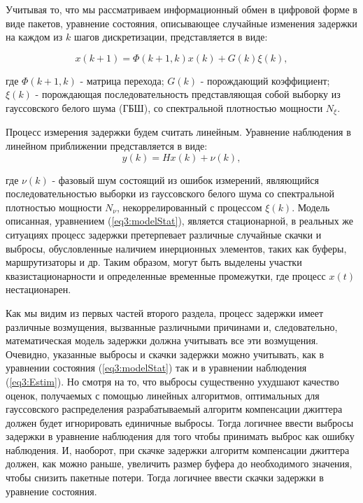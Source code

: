 Учитывая то, что мы рассматриваем информационный обмен в цифровой форме в виде пакетов, уравнение состояния, описывающее случайные изменения задержки на каждом из $k$ шагов дискретизации, представляется в виде:

\begin{equation}\label{eq3:modelStat}
x(k+1)=\Phi(k+1,k)x(k)+G(k)\xi(k),
\end{equation}

\noindent где $\Phi(k+1,k)$ - матрица перехода; $G(k)$ - порождающий коэффициент; $\xi(k)$ - порождающая последовательность представляющая собой выборку из гауссовского белого шума (ГБШ), со спектральной плотностью мощности $N_\xi$.

Процесс измерения задержки будем считать линейным. Уравнение наблюдения в линейном приближении представляется в виде:
\begin{equation}\label{eq3:Estim}
y(k)=Hx(k)+\nu(k),
\end{equation}

\noindent где $\nu(k)$ - фазовый шум состоящий из ошибок измерений, являющийся последовательностью выборки из гауссовского белого шума со спектральной плотностью мощности $N_\nu$, некоррелированный с процессом $\xi(k)$. 
Модель описанная, уравнением (\ref{eq3:modelStat}), является стационарной, в реальных же ситуациях процесс задержки претерпевает различные случайные скачки и выбросы, обусловленные наличием инерционных элементов, таких как буферы, маршрутизаторы и др. Таким образом, могут быть выделены участки квазистационарности и определенные временные промежутки, где процесс $x(t)$ нестационарен.

Как мы видим из первых частей второго раздела, процесс задержки имеет различные возмущения, вызванные различными причинами и, следовательно, математическая модель задержки должна учитывать все эти возмущения.
Очевидно, указанные выбросы и скачки задержки можно учитывать, как в уравнении состояния (\ref{eq3:modelStat}) так и в уравнении наблюдения (\ref{eq3:Estim}). 
Но смотря на то, что выбросы существенно ухудшают качество оценок, получаемых с помощью линейных алгоритмов, оптимальных для гауссовского распределения разрабатываемый алгоритм компенсации джиттера должен будет игнорировать единичные выбросы. Тогда логичнее ввести выбросы задержки в уравнение наблюдения для того чтобы принимать выброс как ошибку наблюдения. 
И, наоборот, при скачке задержки алгоритм компенсации джиттера должен, как можно раньше, увеличить размер буфера до необходимого значения, чтобы снизить пакетные потери. 
Тогда логичнее ввести скачки задержки в уравнение состояния.

